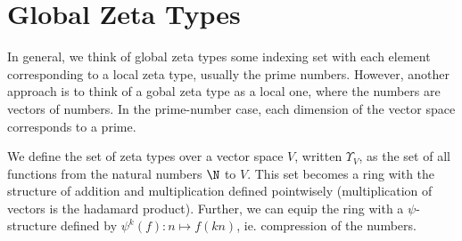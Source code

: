 \section{Global Zeta Types}

In general, we think of global zeta types some indexing set with each element corresponding to a local zeta type, usually the prime numbers. However, another approach is to think of a gobal zeta type as a local one, where the numbers are vectors of numbers. In the prime-number case, each dimension of the vector space corresponds to a prime. 

\begin{propdef}
  We define the set of zeta types over a vector space $V$, written $\Upsilon_V$, as the set of all functions from the natural numbers $\N$ to $V$. This set becomes a ring with the structure of addition and multiplication defined pointwisely (multiplication of vectors is the hadamard product). Further, we can equip the ring with a $\psi$-structure defined by $\psi^k(f) : n \mapsto f(kn)$, ie. compression of the numbers. 
\end{propdef}
